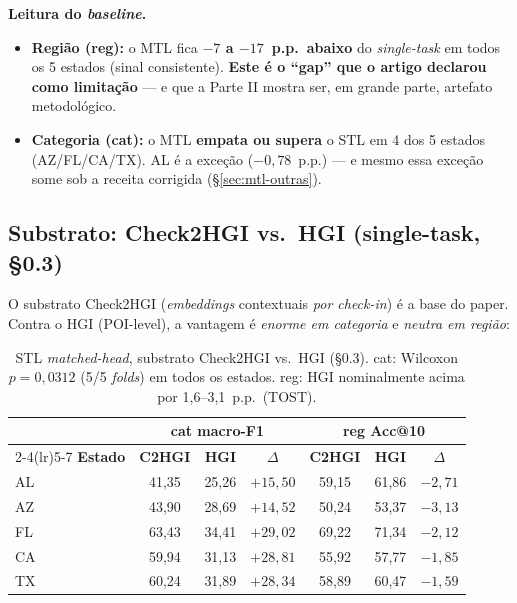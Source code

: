 \documentclass[11pt,a4paper]{article}
\newcommand{\good}[1]{\textcolor{green!45!black}{\textbf{#1}}}
\newcommand{\bad}[1]{\textcolor{red!60!black}{\textbf{#1}}}
\begin{document}
\noindent\textbf{Leitura do \textit{baseline}.}
\begin{itemize}[leftmargin=*,noitemsep]
\item \textbf{Região (reg):} o MTL fica \bad{$-7$ a $-17$~p.p.\ abaixo} do \textit{single-task} em
todos os 5 estados (sinal consistente). \textbf{Este é o ``gap'' que o artigo declarou como
limitação} --- e que a Parte II mostra ser, em grande parte, artefato metodológico.
\item \textbf{Categoria (cat):} o MTL \good{empata ou supera} o STL em 4 dos 5 estados
(AZ/FL/CA/TX). AL é a exceção ($-0,78$~p.p.) --- e mesmo essa exceção some sob a receita
corrigida (\S\ref{sec:mtl-outras}).
\end{itemize}

\subsection{Substrato: Check2HGI vs.\ HGI (single-task, \S0.3)}

O substrato Check2HGI (\textit{embeddings} contextuais \emph{por check-in}) é a base do paper.
Contra o HGI (POI-level), a vantagem é \emph{enorme em categoria} e \emph{neutra em região}:

\begin{table}[H]
\centering
\footnotesize
\caption{STL \textit{matched-head}, substrato Check2HGI vs.\ HGI (\S0.3). cat: Wilcoxon $p=0,0312$
(5/5 \textit{folds}) em todos os estados. reg: HGI nominalmente acima por 1,6--3,1~p.p.\ (TOST).}
\begin{tabular}{lcc c cc c}
\toprule
 & \multicolumn{3}{c}{\textbf{cat macro-F1}} & \multicolumn{3}{c}{\textbf{reg Acc@10}} \\
\cmidrule(lr){2-4}\cmidrule(lr){5-7}
\textbf{Estado} & \textbf{C2HGI} & \textbf{HGI} & \textbf{$\Delta$} & \textbf{C2HGI} & \textbf{HGI} & \textbf{$\Delta$} \\
\midrule
AL & 41,35 & 25,26 & \good{$+15,50$} & 59,15 & 61,86 & $-2,71$ \\
AZ & 43,90 & 28,69 & \good{$+14,52$} & 50,24 & 53,37 & $-3,13$ \\
FL & 63,43 & 34,41 & \good{$+29,02$} & 69,22 & 71,34 & $-2,12$ \\
CA & 59,94 & 31,13 & \good{$+28,81$} & 55,92 & 57,77 & $-1,85$ \\
TX & 60,24 & 31,89 & \good{$+28,34$} & 58,89 & 60,47 & $-1,59$ \\
\bottomrule
\end{tabular}
\end{table}
\end{document}
